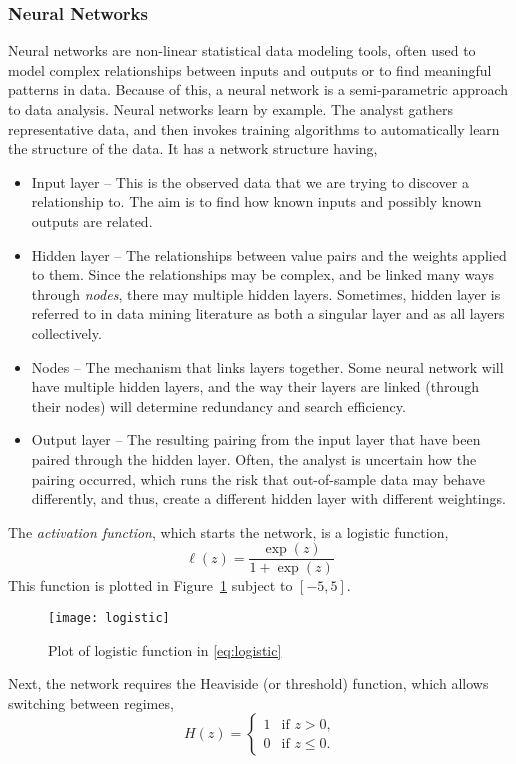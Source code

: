 \subsubsection{Neural Networks}
Neural networks are non-linear statistical data modeling tools, often used to model complex relationships between inputs and outputs or to find meaningful patterns in data. Because of this, a neural network is a semi-parametric approach to data analysis. Neural networks learn by example. The analyst gathers representative data, and then invokes training algorithms to automatically learn the structure of the data. It has a network structure having,
\begin{itemize}
\item Input layer -- This is the observed data that we are trying to discover a relationship to. The aim is to find how known inputs and possibly known outputs are related.
\item Hidden layer -- The relationships between value pairs and the weights applied to them. Since the relationships may be complex, and be linked many ways through \emph{nodes}, there may multiple hidden layers. Sometimes, hidden layer is referred to in data mining literature as both a singular layer and as all layers collectively.
\item Nodes -- The mechanism that links layers together. Some neural network will have multiple hidden layers, and the way their layers are linked (through their nodes) will determine redundancy and search efficiency.
\item Output layer -- The resulting pairing from the input layer that have been paired through the hidden layer. Often, the analyst is uncertain how the pairing occurred, which runs the risk that out-of-sample data may behave differently, and thus, create a different hidden layer with different weightings.
\end{itemize}
The \emph{activation function}, which starts the network, is a logistic function,
\begin{equation}
\ell(z) = \frac{\exp(z)}{1+\exp(z)}
\label{eq:logistic}
\end{equation}
This function is plotted in Figure~\ref{figure:logistic} subject to $[-5,5]$.
\begin{figure}[tb]
	\centering
	\texttt{[image: logistic]}
	\caption{Plot of logistic function in \eqref{eq:logistic}}
	\label{figure:logistic}
\end{figure}
Next, the network requires the Heaviside (or threshold) function, which allows switching between regimes,
\[
H(z)=
\begin{cases}
1 &\text{if $z>0$,} \\
0 &\text{if $z \le 0$.}
\end{cases}
\]

